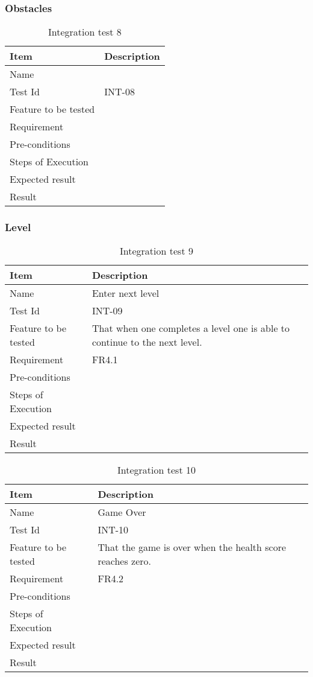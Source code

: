 \subsubsection{Obstacles}

\begin{table}[H]
\centering
	\begin{tabular}{ l | p{8cm} }
		\hline
		{\bf Item} & {\bf Description} \\ \hline
		Name & \\ 
		Test Id & INT-08 \\ 
		Feature to be tested & \\ 
		Requirement & \\ 
		Pre-conditions & \\ 
		Steps of Execution & \\ 
		Expected result & \\ 
		Result & \\ 
	\end{tabular}
	\caption{Integration test 8}
\end{table}

\subsubsection{Level}

\begin{table}[H]
\centering
	\begin{tabular}{ l | p{8cm} }
		\hline
		{\bf Item} & {\bf Description} \\ \hline
		Name & Enter next level \\ 
		Test Id & INT-09 \\ 
		Feature to be tested & That when one completes a level one is able to continue to the next level. \\ 
		Requirement & FR4.1 \\ 
		Pre-conditions & \\ 
		Steps of Execution & \\ 
		Expected result & \\ 
		Result & \\ 
	\end{tabular}
	\caption{Integration test 9}
\end{table}

\begin{table}[H]
\centering
	\begin{tabular}{ l | p{8cm} }
		\hline
		{\bf Item} & {\bf Description} \\ \hline
		Name & Game Over \\ 
		Test Id & INT-10 \\ 
		Feature to be tested & That the game is over when the health score reaches zero. \\ 
		Requirement & FR4.2 \\ 
		Pre-conditions & \\ 
		Steps of Execution & \\ 
		Expected result & \\ 
		Result & \\ 
	\end{tabular}
	\caption{Integration test 10}
\end{table}



